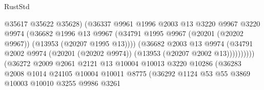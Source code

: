 \begin{lexlean}{RustStd}
\begin{coremodule}
                                          @35617
                                          @35622
                                          @35628)
                                        (@36337
                                          @9961
                                          @1996
                                          @2003
                                          @13
                                          @3220
                                          @9967
                                          @3220
                                          @9974
                                          (@36682
                                            @1996
                                            @13
                                            @9967
                                            (@34791
                                              @1995
                                              @9967
                                              (@20201 (@20202 @9967))
                                              (@13953 (@20207 @1995 @13))))
                                          (@36682
                                            @2003
                                            @13
                                            @9974
                                            (@34791
                                              @2002
                                              @9974
                                              (@20201 (@20202 @9974))
                                              (@13953 (@20207 @2002 @13))))))))))
                              (@36272
                                @2009
                                @2061
                                @2121
                                @13
                                @10004
                                @10013
                                @3220
                                @10286
                                (@36283
                                  @2008
                                  @1014
                                  @24105
                                  @10004
                                  @10011
                                  @8775
                                  (@36292
                                    @1124
                                    @53
                                    @55
                                    @3869
                                    @10003
                                    @10010
                                    @3255
                                    @9986
                                    @3261

\end{coremodule}
\end{lexlean}
